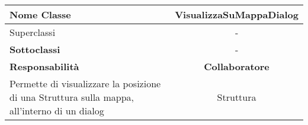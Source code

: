 
\setcounter{table}{0}
\begin{table}[H]
    \centering
    \begin{tabularx}{\textwidth}{||   X  ||  c   ||}
        \hline
        \rowcolor{Gray}
        \textbf{Nome Classe} & VisualizzaSuMappaDialog\\
        \hline
        Superclassi  &  - \\
        \hline
        \textbf{Sottoclassi} & - \\
        \hline
         \textbf{Responsabilità} & \textbf{Collaboratore} \\
         \hline
         Permette di visualizzare la posizione di una Struttura sulla mappa, all'interno di un dialog& Struttura \\
         \hline
    \end{tabularx}
\end{table}
